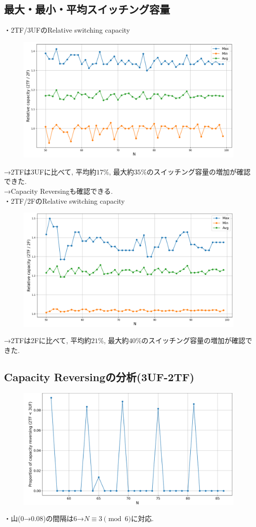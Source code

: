 \documentclass[11pt, a4paper]{jarticle}
\begin{document}
\subsection{最大・最小・平均スイッチング容量}
・2TF/3UFのRelative switching capacity
\begin{figure}[H]
  \centering
  \includegraphics[width=0.8\linewidth]{maxmin_capacity_3uf.png}
\end{figure}

\noindent →2TFは3UFに比べて, 平均約$17\%$, 最大約$35\%$のスイッチング容量の増加が確認できた.\\
→Capacity Reversingも確認できる. \\

・2TF/2FのRelative switching capacity
\begin{figure}[H]
  \centering
  \includegraphics[width=0.8\linewidth]{maxmin_capacity_2f.png}
\end{figure}

→2TFは2Fに比べて, 平均約$21\%$, 最大約$40\%$のスイッチング容量の増加が確認できた.


\subsection{Capacity Reversingの分析(3UF-2TF)}
\begin{figure}[H]
  \centering
  \includegraphics[width=0.8\linewidth]{capacity_reversing_1.png}
\end{figure}

\noindent ・山(0→0.08)の間隔は6→$N \equiv 3 \pmod{6}$に対応. \\
\end{document}
